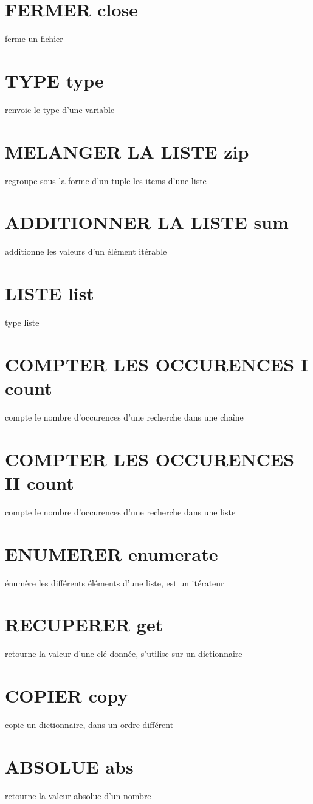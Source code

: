 \documentclass{book}
\begin{document}
\section{FERMER close }
  ferme un fichier
\section{TYPE type }
  renvoie le type d'une variable
\section{MELANGER LA LISTE zip }
  regroupe sous la forme d'un tuple les items d'une liste
\section{ADDITIONNER LA LISTE sum }
  additionne les valeurs d'un élément itérable 
\section{LISTE list }
  type liste
\section{COMPTER LES OCCURENCES I count }
  compte le nombre d'occurences d'une recherche dans une chaîne
\section{COMPTER LES OCCURENCES II count }
  compte le nombre d'occurences d'une recherche dans une liste
\section{ENUMERER enumerate }
  énumère les différents éléments d'une liste, est un itérateur 
\section{RECUPERER get}  retourne la valeur d'une clé donnée, s'utilise sur un dictionnaire
\section{COPIER copy }
  copie un dictionnaire, dans un ordre différent
\section{ABSOLUE abs }
  retourne la valeur absolue d'un nombre
\end{document}
